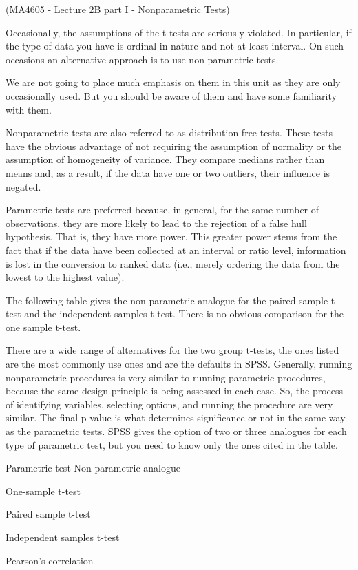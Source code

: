 (MA4605 - Lecture 2B part I - Nonparametric Tests)

Occasionally, the assumptions of the t-tests are seriously violated. In particular, if the type of data you have is ordinal in nature and not at least interval. On such occasions an alternative approach is to use non-parametric tests. 

We are not going to place much emphasis on them in this unit as they are only occasionally used. But you should be aware of them and have some familiarity with them.

Nonparametric tests are also referred to as distribution-free tests. These tests have the obvious advantage of not requiring the assumption of normality or the assumption of homogeneity of variance. They compare medians rather than means and, as a result, if the data have one or two outliers, their influence is negated.

Parametric tests are preferred because, in general, for the same number of observations, they are more likely to lead to the rejection of a false hull hypothesis. That is, they have more power. This greater power stems from the fact that if the data have been collected at an interval or ratio level, information is lost in the conversion to ranked data (i.e., merely ordering the data from the lowest to the highest value).

The following table gives the non-parametric analogue for the paired sample t-test and the independent samples t-test. There is no obvious comparison for the one sample t-test. 

There are a wide range of alternatives for the two group t-tests, the ones listed are the most commonly use ones and are the defaults in SPSS. Generally, running nonparametric procedures is very similar to running parametric procedures, because the same design principle is being assessed in each case. So, the process of identifying variables, selecting options, and running the procedure are very similar. The final p-value is what determines significance or not in the same way as the parametric tests. SPSS gives the option of two or three analogues for each type of parametric test, but you need to know only the ones cited in the table. 

Parametric test
	Non-parametric analogue

One-sample t-test 

Paired sample t-test 

Independent samples t-test 

Pearson's correlation 

